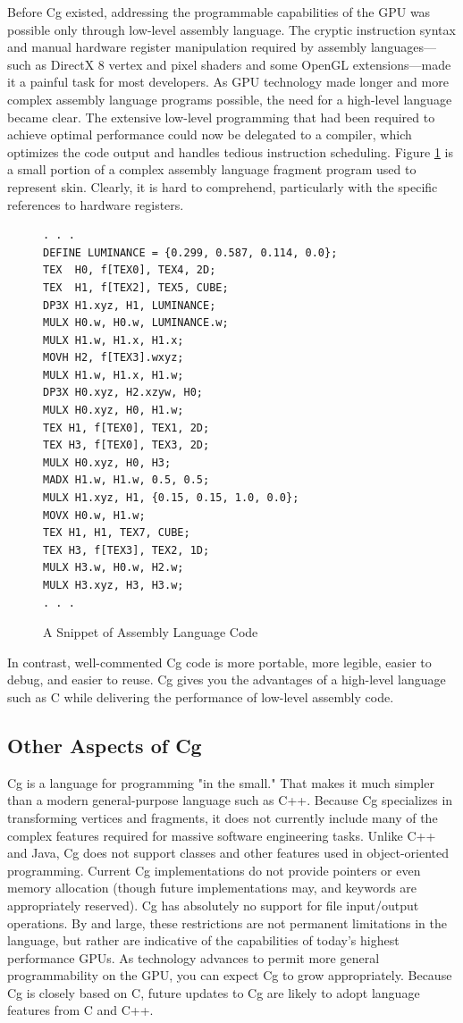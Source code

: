 \documentclass{book}
\begin{document}
Before Cg existed, addressing the programmable capabilities of the GPU was possible only through low-level assembly language. The cryptic instruction syntax and manual hardware register manipulation required by assembly languages—such as DirectX 8 vertex and pixel shaders and some OpenGL extensions—made it a painful task for most developers. As GPU technology made longer and more complex assembly language programs possible, the need for a high-level language became clear. The extensive low-level programming that had been required to achieve optimal performance could now be delegated to a compiler, which optimizes the code output and handles tedious instruction scheduling. Figure \ref{fig:1-1} is a small portion of a complex assembly language fragment program used to represent skin. Clearly, it is hard to comprehend, particularly with the specific references to hardware registers.

\begin{figure}
\begin{lstlisting}
. . .
DEFINE LUMINANCE = {0.299, 0.587, 0.114, 0.0};
TEX  H0, f[TEX0], TEX4, 2D;
TEX  H1, f[TEX2], TEX5, CUBE;
DP3X H1.xyz, H1, LUMINANCE;
MULX H0.w, H0.w, LUMINANCE.w;
MULX H1.w, H1.x, H1.x;
MOVH H2, f[TEX3].wxyz;
MULX H1.w, H1.x, H1.w;
DP3X H0.xyz, H2.xzyw, H0;
MULX H0.xyz, H0, H1.w;
TEX H1, f[TEX0], TEX1, 2D;
TEX H3, f[TEX0], TEX3, 2D;
MULX H0.xyz, H0, H3;
MADX H1.w, H1.w, 0.5, 0.5;
MULX H1.xyz, H1, {0.15, 0.15, 1.0, 0.0};
MOVX H0.w, H1.w;
TEX H1, H1, TEX7, CUBE;
TEX H3, f[TEX3], TEX2, 1D;
MULX H3.w, H0.w, H2.w;
MULX H3.xyz, H3, H3.w;
. . .
\end{lstlisting}
\caption{A Snippet of Assembly Language Code}
\label{fig:1-1}
\end{figure}

In contrast, well-commented Cg code is more portable, more legible, easier to debug, and easier to reuse. Cg gives you the advantages of a high-level language such as C while delivering the performance of low-level assembly code.

\subsection{Other Aspects of Cg}

Cg is a language for programming "in the small." That makes it much simpler than a modern general-purpose language such as C++. Because Cg specializes in transforming vertices and fragments, it does not currently include many of the complex features required for massive software engineering tasks. Unlike C++ and Java, Cg does not support classes and other features used in object-oriented programming. Current Cg implementations do not provide pointers or even memory allocation (though future implementations may, and keywords are appropriately reserved). Cg has absolutely no support for file input/output operations. By and large, these restrictions are not permanent limitations in the language, but rather are indicative of the capabilities of today's highest performance GPUs. As technology advances to permit more general programmability on the GPU, you can expect Cg to grow appropriately. Because Cg is closely based on C, future updates to Cg are likely to adopt language features from C and C++.
\end{document}
